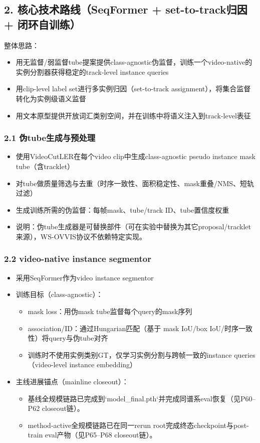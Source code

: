 \documentclass[UTF8]{ctexart}
\begin{document}
\par\noindent\hrulefill\par


\subsection*{2. 核心技术路线（SeqFormer + set-to-track归因 + 闭环自训练）}
整体思路：
\begin{itemize}
\item 用无监督/弱监督tube提案提供class-agnostic伪监督，训练一个video-native的实例分割器获得稳定的track-level instance queries
\item 用clip-level label set进行多实例归因（set-to-track assignment），将集合监督转化为实例级语义监督
\item 用文本原型提供开放词汇类别空间，并在训练中将语义注入到track-level表征
\end{itemize}

\subsubsection*{2.1 伪tube生成与预处理}
\begin{itemize}
\item 使用VideoCutLER在每个video clip中生成class-agnostic pseudo instance mask tube（含tracklet）
\item 对tube做质量筛选与去重（时序一致性、面积稳定性、mask重叠/NMS、短轨过滤）
\item 生成训练所需的伪监督：每帧mask、tube/track ID、tube置信度权重
\item 说明：伪tube生成器是可替换部件（可在实验中替换为其它proposal/tracklet来源），WS-OVVIS协议不依赖特定实现。
\end{itemize}

\subsubsection*{2.2 video-native instance segmentor}
\begin{itemize}
\item 采用SeqFormer作为video instance segmentor
\item 训练目标（class-agnostic）：
\begin{itemize}
\item mask loss：用伪mask tube监督每个query的mask序列
\item association/ID：通过Hungarian匹配（基于 mask IoU/box IoU/时序一致性）将query与伪tube对齐
\item 训练时不使用实例类别GT，仅学习实例分割与跨帧一致的instance queries（video-level instance embedding）
\end{itemize}
\item 主线进展锚点（mainline closeout）：
\begin{itemize}
\item 基线全规模链路已完成到`model_final.pth`并完成同谱系eval恢复（见P60--P62 closeout链）。
\item method-active全规模链路已在同一rerun root完成终态checkpoint与post-train eval产物（见P65--P68 closeout链）。
\end{itemize}
\end{itemize}
\end{document}
